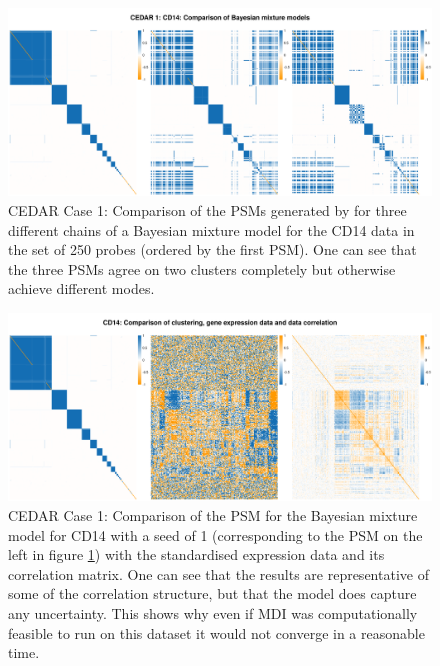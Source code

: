 \documentclass[12pt]{article} %
\begin{document}
	\begin{figure} %
		\centering
		\includegraphics[scale=0.5]{Images/Biology_data/Set_250/Bayesian_mixture_models/CD14_comparison_across_seeds.png}
		\caption{CEDAR Case 1: Comparison of the PSMs generated by for three different chains of a Bayesian mixture model for the CD14 data in the set of 250 probes (ordered by the first PSM). One can see that the three PSMs agree on two clusters completely but otherwise achieve different modes.}
		\label{fig:results:cedar_1:cd14_bayes_mixture_model_comp}
	\end{figure}

	\begin{figure} %
		\centering
		\includegraphics[scale=0.45]{Images/Biology_data/Set_250/Bayesian_mixture_models/Comparison_expression_clustering_correlation/CD14.png}
		\caption{CEDAR Case 1: Comparison of the PSM for the Bayesian mixture model for CD14 with a seed of 1 (corresponding to the PSM on the left in figure \ref{fig:results:cedar_1:cd14_bayes_mixture_model_comp}) with the standardised expression data and its correlation matrix. One can see that the results are representative of some of the correlation structure, but that the model does capture any uncertainty. This shows why even if MDI was computationally feasible to run on this dataset it would not converge in a reasonable time.}
		\label{fig:results:cedar_1:cd14_bayes_mixture_model_comp_seed_1}
	\end{figure}
	
\end{document}
